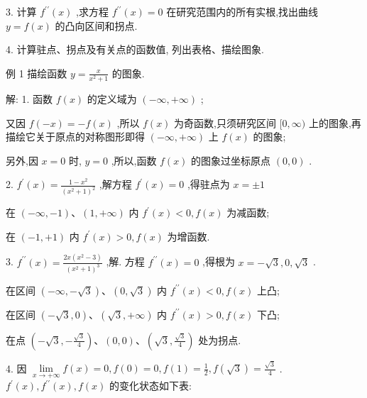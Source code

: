 \documentclass[lang=cn,newtx,10pt,scheme=chinese]{elegantbook}
\begin{document}
3. 计算 \({f}^{\prime \prime }\left( x\right)\) ,求方程 \({f}^{\prime \prime }\left( x\right) = 0\) 在研究范围内的所有实根,找出曲线 \(y = f\left( x\right)\) 的凸向区间和拐点.

4. 计算驻点、拐点及有关点的函数值, 列出表格、描绘图象.

例 1 描绘函数 \(y = \frac{x}{{x}^{2} + 1}\) 的图象.

解: 1. 函数 \(f\left( x\right)\) 的定义域为 \(\left( {-\infty , + \infty }\right)\) ;

又因 \(f\left( {-x}\right) = - f\left( x\right)\) ,所以 \(f\left( x\right)\) 为奇函数,只须研究区间 \(\lbrack 0,\infty )\) 上的图象,再描绘它关于原点的对称图形即得 \(\left( {-\infty , + \infty }\right)\) 上 \(f\left( x\right)\) 的图象;

另外,因 \(x = 0\) 时, \(y = 0\) ,所以,函数 \(f\left( x\right)\) 的图象过坐标原点 \(\left( {0,0}\right)\) .

2. \({f}^{\prime }\left( x\right) = \frac{1 - {x}^{2}}{{\left( {x}^{2} + 1\right) }^{2}}\) ,解方程 \({f}^{\prime }\left( x\right) = 0\) ,得驻点为 \(x = \pm 1\)

在 \(\left( {-\infty , - 1}\right) \text{、}\left( {1, + \infty }\right)\) 内 \({f}^{\prime }\left( x\right) < 0,f\left( x\right)\) 为减函数;

在 \(\left( {-1, + 1}\right)\) 内 \({f}^{\prime }\left( x\right) > 0,f\left( x\right)\) 为增函数.

3. \({f}^{\prime \prime }\left( x\right) = \frac{{2x}\left( {{x}^{2} - 3}\right) }{{\left( {x}^{2} + 1\right) }^{3}}\) ,解. 方程 \({f}^{\prime \prime }\left( x\right) = 0\) ,得根为 \(x = - \sqrt{3},0,\sqrt{3}\) .

在区间 \(\left( {-\infty , - \sqrt{3}}\right) \text{、}\left( {0,\sqrt{3}}\right)\) 内 \({f}^{\prime \prime }\left( x\right) < 0,f\left( x\right)\) 上凸;

在区间 \(\left( {-\sqrt{3},0}\right) \text{、}\left( {\sqrt{3}, + \infty }\right)\) 内 \({f}^{\prime \prime }\left( x\right) > 0,f\left( x\right)\) 下凸;

在点 \(\left( {-\sqrt{3}, - \frac{\sqrt{3}}{4}}\right) \text{、}\left( {0,0}\right) \text{、}\left( {\sqrt{3},\frac{\sqrt{3}}{4}}\right)\) 处为拐点.

4. 因 \(\mathop{\lim }\limits_{{x \rightarrow + \infty }}f\left( x\right) = 0,f\left( 0\right) = 0,f\left( 1\right) = \frac{1}{2},f\left( \sqrt{3}\right) = \frac{\sqrt{3}}{4}\) . \({f}^{\prime }\left( x\right) ,{f}^{\prime \prime }\left( x\right) ,f\left( x\right)\) 的变化状态如下表:
\end{document}

